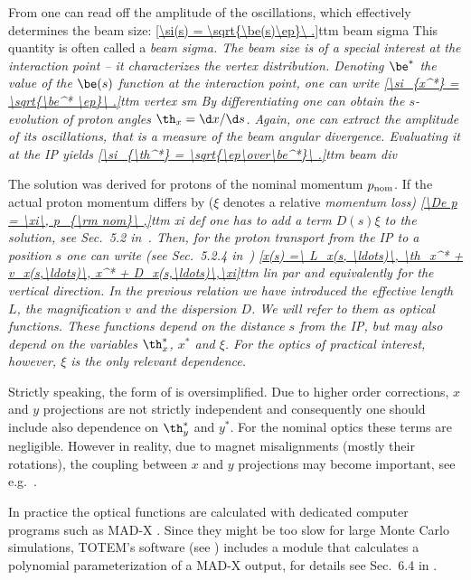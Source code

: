 From  one can read off the amplitude of the oscillations, which effectively determines the beam size:
\eqref{\si(s) = \sqrt{\be(s)\ep}\ .}{ttm beam sigma}
This quantity is often called a \em{beam sigma}. The beam size is of a special interest at the interaction point -- it characterizes the vertex distribution. Denoting $\be^*$ the value of the $\be(s)$ function at the interaction point, one can write
\eqref{\si_{x^*} = \sqrt{\be^* \ep}\ .}{ttm vertex sm}
By differentiating  one can obtain the $s$-evolution of proton angles $\th_x = \d x/\d s$. Again, one can extract the amplitude of its oscillations, that is a measure of the beam angular divergence. Evaluating it at the IP yields
\eqref{\si_{\th^*} = \sqrt{\ep\over\be^*}\ .}{ttm beam div}

The solution  was derived for protons of the nominal momentum $p_{\rm nom}$. If the actual proton momentum differs by ($\xi$ denotes a relative \em{momentum loss})
\eqref{\De p = \xi\, p_{\rm nom}\ ,}{ttm xi def}
one has to add a term $D(s) \xi$ to the solution, see Sec.~5.2 in~. Then, for the proton transport from the IP to a position $s$ one can write (see Sec.~5.2.4 in~)
\eqref{x(s) =\ L_x(s, \ldots)\, \th_x^* + v_x(s,\ldots)\, x^* + D_x(s,\ldots)\,\xi}{ttm lin par}
and equivalently for the vertical direction. In the previous relation we have introduced the \em{effective length} $L$, the \em{magnification} $v$ and the \em{dispersion} $D$. We will refer to them as \em{optical functions}. These functions depend on the distance $s$ from the IP, but may also depend on the variables $\th_x^*$, $x^*$ and $\xi$. For the optics of practical interest, however, $\xi$ is the only relevant dependence.

Strictly speaking, the form of  is oversimplified. Due to higher order corrections, $x$ and $y$ projections are not strictly independent and consequently one should include also dependence on $\th_y^*$ and $y^*$. For the nominal optics these terms are negligible. However in reality, due to magnet misalignments (mostly their rotations), the coupling between $x$ and $y$ projections may become important, see e.g.~.

In practice the optical functions are calculated with dedicated computer programs such as MAD-X . Since they might be too slow for large Monte Carlo simulations, TOTEM's software (see ) includes a module that calculates a polynomial parameterization of a MAD-X output, for details see Sec.~6.4 in .

